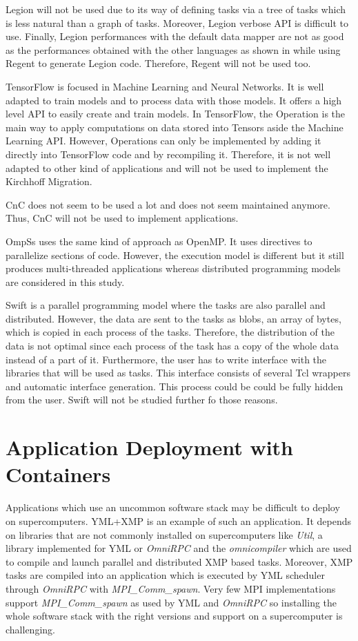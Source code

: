Legion will not be used due to its way of defining tasks via a tree of tasks which is less natural than a graph of tasks.
Moreover, Legion verbose API is difficult to use.
Finally, Legion performances with the default data mapper are not as good as the performances obtained with the other languages as shown in \cite{GurhP2020} while using Regent to generate Legion code.
Therefore, Regent will not be used too.


TensorFlow is focused in Machine Learning and Neural Networks.
It is well adapted to train models and to process data with those models.
It offers a high level API to easily create and train models.
In TensorFlow, the Operation is the main way to apply computations on data stored into Tensors aside the Machine Learning API.
However, Operations can only be implemented by adding it directly into TensorFlow code and by recompiling it.
Therefore, it is not well adapted to other kind of applications and will not be used to implement the Kirchhoff Migration.

CnC does not seem to be used a lot and does not seem maintained anymore.
Thus, CnC will not be used to implement applications.

OmpSs uses the same kind of approach as OpenMP.
It uses directives to parallelize sections of code.
However, the execution model is different but it still produces multi-threaded applications whereas distributed programming models are considered in this study.

Swift is a parallel programming model where the tasks are also parallel and distributed.
However, the data are sent to the tasks as blobs, an array of bytes, which is copied in each process of the tasks.
Therefore, the distribution of the data is not optimal since each process of the task has a copy of the whole data instead of a part of it.
Furthermore, the user has to write interface with the libraries that will be used as tasks.
This interface consists of several Tcl wrappers and automatic interface generation.
This process could be could be fully hidden from the user.
Swift will not be studied further fo those reasons.

\section{Application Deployment with Containers}
Applications which use an uncommon software stack may be difficult to deploy on supercomputers.
YML+XMP is an example of such an application.
It depends on libraries that are not commonly installed on supercomputers like \textit{Util}, a library implemented for YML or \textit{OmniRPC} and the \textit{omnicompiler} which are used to compile and launch parallel and distributed XMP based tasks.
Moreover, XMP tasks are compiled into an application which is executed by YML scheduler through \textit{OmniRPC} with \textit{MPI\_Comm\_spawn}.
Very few MPI implementations support \textit{MPI\_Comm\_spawn} as used by YML and \textit{OmniRPC} so installing the whole software stack with the right versions and support on a supercomputer is challenging.

